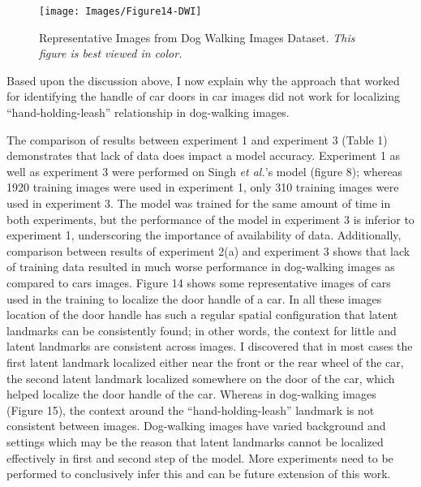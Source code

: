 \documentclass [11pt,letterpaper ,openany ]{report}
\begin{document}
    \begin{figure}[t!]
      \centering
      \texttt{[image: Images/Figure14-DWI]}
      \caption{Representative Images from Dog Walking Images Dataset. \textit{This figure is best viewed in color.}}
      \label{fig:dwi}
    \end{figure}            

    Based upon the discussion above, I now explain why the approach that worked for identifying the handle of car doors in car images did not work for localizing ``hand-holding-leash'' relationship in dog-walking images.    

    The comparison of results between experiment 1 and experiment 3 (Table 1) demonstrates that lack of data does impact a model accuracy. Experiment 1 as well as experiment 3 were performed on Singh \textit{et al.}'s model (figure 8); whereas 1920 training images were used in experiment 1, only 310 training images were used in experiment 3. The model was trained for the same amount of time in both experiments, but the performance of the model in experiment 3 is inferior to experiment 1, underscoring the importance of availability of data. Additionally, comparison between results of experiment 2(a) and experiment 3 shows that lack of training data resulted in much worse performance in dog-walking images as compared to cars images. Figure 14 shows some representative images of cars used in the training to localize the door handle of a car. In all these images location of the door handle has such a regular spatial configuration that latent landmarks can be consistently found; in other words, the context for little and latent landmarks are consistent across images. I discovered that in most cases the first latent landmark localized either near the front or the rear wheel of the car, the second latent landmark localized somewhere on the door of the car, which helped localize the door handle of the car. Whereas in dog-walking images (Figure 15), the context around the ``hand-holding-leash'' landmark is not consistent between images. Dog-walking images have varied background and settings which may be the reason that latent landmarks cannot be localized effectively in first and second step of the model. More experiments need to be performed to conclusively infer  this and can be future extension of this work.
\end{document}
